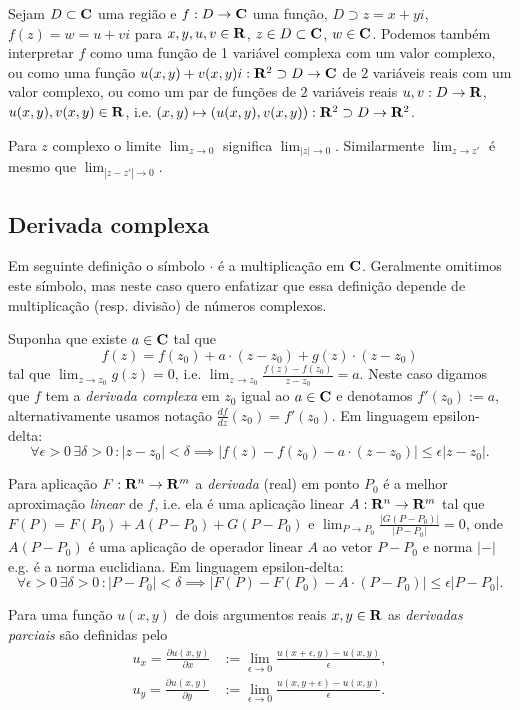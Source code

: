 Sejam $D\subset \mathbf{C}$ uma região e $f : D \to \mathbf{C}$ uma função,
$D\supset z = x + yi$, $f(z) = w = u + v i$ para $x,y,u,v\in \mathbf{R}$, $z\in D\subset \mathbf{C}$, $w\in \mathbf{C}$.
Podemos também interpretar $f$ como uma função de 1 variável complexa com um valor complexo,
ou como uma função $u(x,y) + v(x,y) i : \mathbf{R}^2\supset D \to \mathbf{C}$ de $2$ variáveis reais com um valor complexo,
ou como um par de funções de $2$ variáveis reais
$u,v : D \to \mathbf{R}$, $u(x,y), v(x,y) \in \mathbf{R}$,
i.e. $(x,y) \mapsto (u(x,y),v(x,y)) : \mathbf{R}^2 \supset D \to \mathbf{R}^2$.

Para $z$ complexo o limite $\lim_{z\to 0}$ significa $\lim_{|z|\to 0}$.
Similarmente $\lim_{z\to z'}$ é mesmo que $\lim_{|z-z'|\to 0}$.

\subsection{Derivada complexa}
Em seguinte definição o símbolo $\cdot$ é a multiplicação em $\mathbf{C}$.
Geralmente omitimos este símbolo, mas neste caso quero enfatizar que essa definição depende
de multiplicação (resp. divisão) de números complexos.
\begin{defin}
\label{d:derivada-complexa}
Suponha que existe $a\in \mathbf{C}$ tal que
\[ f(z) = f(z_0) + a \cdot (z-z_0) + g(z) \cdot (z-z_0) \]
tal que $\lim_{z\to z_0} g(z) = 0$,
i.e. $\lim_{z\to z_0} \frac{f(z)-f(z_0)}{z-z_0} = a$.
Neste caso digamos que $f$ tem a \emph{derivada complexa} em $z_0$ igual ao $a\in \mathbf{C}$
e denotamos $f'(z_0) := a$, alternativamente usamos notação $\frac{df}{dz}(z_0) = f'(z_0)$.
Em linguagem epsilon-delta:
\[ \forall\epsilon>0 \, \exists\delta>0 \, : |z-z_0|<\delta  \implies
|f(z) - f(z_0) - a \cdot (z-z_0)| \leq \epsilon |z-z_0|. \]
\end{defin}

\begin{defin}
Para aplicação $F: \mathbf{R}^n \to \mathbf{R}^m$ a \emph{derivada} (real) em ponto $P_0$
é a melhor aproximação \emph{linear} de $f$, i.e. ela é uma aplicação linear $A: \mathbf{R}^n \to \mathbf{R}^m$
tal que $F(P) = F(P_0) + A (P-P_0) + G(P-P_0)$ e $\lim_{P\to P_0} \frac{|G(P-P_0)|}{|P-P_0|} = 0$,
onde $A (P-P_0)$ é uma aplicação de operador linear $A$ ao vetor $P-P_0$
e norma $|-|$ e.g. é a norma euclidiana. Em linguagem epsilon-delta:
\[ \forall\epsilon>0 \, \exists\delta>0 \, : |P-P_0|<\delta  \implies
|F(P) - F(P_0) - A \cdot (P-P_0)| \leq \epsilon |P-P_0|. \]
\end{defin}

\begin{defin}
Para uma função $u(x,y)$ de dois argumentos reais $x,y\in\mathbf{R}$
as \emph{derivadas parciais} são definidas pelo
\begin{align*}
u_x = \frac{\partial u(x,y)}{\partial x} &:= \lim_{\epsilon\to 0} \frac{u(x+\epsilon,y)-u(x,y)}{\epsilon},\\
u_y = \frac{\partial u(x,y)}{\partial y} &:= \lim_{\epsilon\to 0} \frac{u(x,y+\epsilon)-u(x,y)}{\epsilon}.
\end{align*}
\end{defin}

